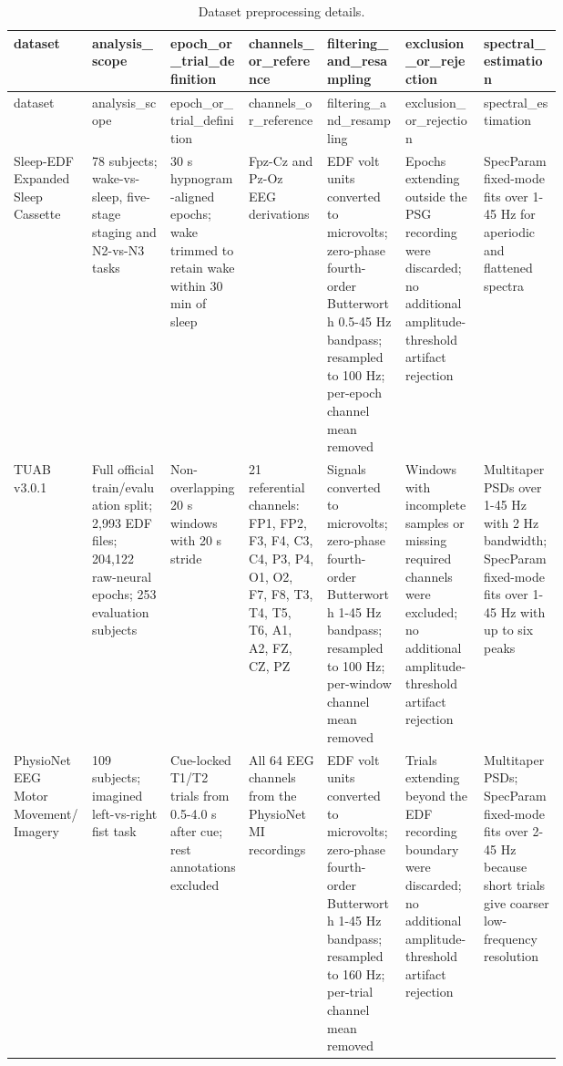 \begin{longtable}{p{0.10\linewidth}p{0.10\linewidth}p{0.10\linewidth}p{0.10\linewidth}p{0.10\linewidth}p{0.10\linewidth}p{0.10\linewidth}}
\caption{Dataset preprocessing details.}\label{tab:supp_preprocessing_details}\\
\toprule
dataset & analysis\_scope & epoch\_or\_trial\_definition & channels\_or\_reference & filtering\_and\_resampling & exclusion\_or\_rejection & spectral\_estimation\\
\midrule
\endfirsthead
\toprule
dataset & analysis\_scope & epoch\_or\_trial\_definition & channels\_or\_reference & filtering\_and\_resampling & exclusion\_or\_rejection & spectral\_estimation\\
\midrule
\endhead
Sleep-EDF Expanded Sleep Cassette & 78 subjects; wake-vs-sleep, five-stage staging and N2-vs-N3 tasks & 30 s hypnogram-aligned epochs; wake trimmed to retain wake within 30 min of sleep & Fpz-Cz and Pz-Oz EEG derivations & EDF volt units converted to microvolts; zero-phase fourth-order Butterworth 0.5-45 Hz bandpass; resampled to 100 Hz; per-epoch channel mean removed & Epochs extending outside the PSG recording were discarded; no additional amplitude-threshold artifact rejection & SpecParam fixed-mode fits over 1-45 Hz for aperiodic and flattened spectra\\
TUAB v3.0.1 & Full official train/evaluation split; 2,993 EDF files; 204,122 raw-neural epochs; 253 evaluation subjects & Non-overlapping 20 s windows with 20 s stride & 21 referential channels: FP1, FP2, F3, F4, C3, C4, P3, P4, O1, O2, F7, F8, T3, T4, T5, T6, A1, A2, FZ, CZ, PZ & Signals converted to microvolts; zero-phase fourth-order Butterworth 1-45 Hz bandpass; resampled to 100 Hz; per-window channel mean removed & Windows with incomplete samples or missing required channels were excluded; no additional amplitude-threshold artifact rejection & Multitaper PSDs over 1-45 Hz with 2 Hz bandwidth; SpecParam fixed-mode fits over 1-45 Hz with up to six peaks\\
PhysioNet EEG Motor Movement/Imagery & 109 subjects; imagined left-vs-right fist task & Cue-locked T1/T2 trials from 0.5-4.0 s after cue; rest annotations excluded & All 64 EEG channels from the PhysioNet MI recordings & EDF volt units converted to microvolts; zero-phase fourth-order Butterworth 1-45 Hz bandpass; resampled to 160 Hz; per-trial channel mean removed & Trials extending beyond the EDF recording boundary were discarded; no additional amplitude-threshold artifact rejection & Multitaper PSDs; SpecParam fixed-mode fits over 2-45 Hz because short trials give coarser low-frequency resolution\\
\bottomrule
\end{longtable}
